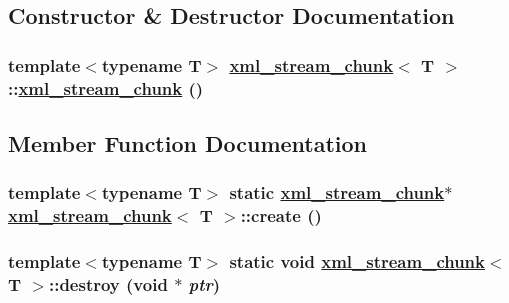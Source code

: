 \subsection{Constructor \& Destructor Documentation}
\hypertarget{structxml__stream__chunk_8b87fcb2074014dd252f752a95092337}{
\subsubsection[xml\_\-stream\_\-chunk]{\setlength{\rightskip}{0pt plus 5cm}template$<$typename T$>$ \hyperlink{structxml__stream__chunk}{xml\_\-stream\_\-chunk}$<$ T $>$::\hyperlink{structxml__stream__chunk}{xml\_\-stream\_\-chunk} ()}}
\label{structxml__stream__chunk_8b87fcb2074014dd252f752a95092337}




\subsection{Member Function Documentation}
\hypertarget{structxml__stream__chunk_92cffe33c529ff266329fd4afb59226d}{
\subsubsection[create]{\setlength{\rightskip}{0pt plus 5cm}template$<$typename T$>$ static \hyperlink{structxml__stream__chunk}{xml\_\-stream\_\-chunk}$\ast$ \hyperlink{structxml__stream__chunk}{xml\_\-stream\_\-chunk}$<$ T $>$::create ()}}
\label{structxml__stream__chunk_92cffe33c529ff266329fd4afb59226d}


\hypertarget{structxml__stream__chunk_4b812901d59950d48d539e5c8726a0e8}{
\subsubsection[destroy]{\setlength{\rightskip}{0pt plus 5cm}template$<$typename T$>$ static void \hyperlink{structxml__stream__chunk}{xml\_\-stream\_\-chunk}$<$ T $>$::destroy (void $\ast$ {\em ptr})}}
\label{structxml__stream__chunk_4b812901d59950d48d539e5c8726a0e8}




